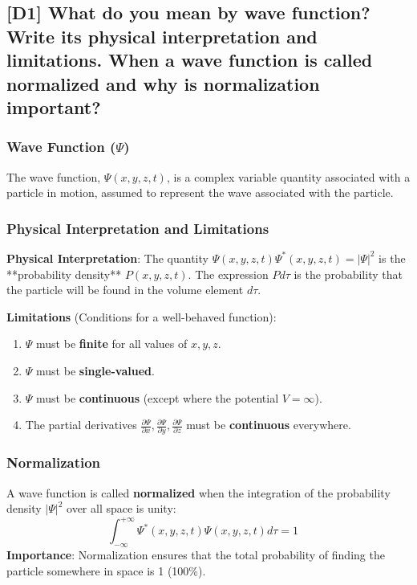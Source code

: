 \documentclass[12pt]{article}
\begin{document}
\subsection{[D1] What do you mean by wave function? Write its physical interpretation and limitations. When a wave function is called normalized and why is normalization important?}

\subsubsection*{Wave Function ($\Psi$)}
The wave function, $\Psi(x, y, z, t)$, is a complex variable quantity associated with a particle in motion, assumed to represent the wave associated with the particle.

\subsubsection*{Physical Interpretation and Limitations}
\textbf{Physical Interpretation}: The quantity $\Psi(x, y, z, t) \Psi^*(x, y, z, t) = |\Psi|^2$ is the **probability density** $P(x, y, z, t)$. The expression $P d\tau$ is the probability that the particle will be found in the volume element $d\tau$.

\textbf{Limitations} (Conditions for a well-behaved function):
\begin{enumerate}
    \item $\Psi$ must be \textbf{finite} for all values of $x, y, z$.
    \item $\Psi$ must be \textbf{single-valued}.
    \item $\Psi$ must be \textbf{continuous} (except where the potential $V = \infty$).
    \item The partial derivatives $\frac{\partial\Psi}{\partial x}, \frac{\partial\Psi}{\partial y}, \frac{\partial\Psi}{\partial z}$ must be \textbf{continuous} everywhere.
\end{enumerate}

\subsubsection*{Normalization}
A wave function is called \textbf{normalized} when the integration of the probability density $|\Psi|^2$ over all space is unity:
$$
\int_{-\infty}^{+\infty} \Psi^*(x, y, z, t) \Psi(x, y, z, t) d\tau = 1 \quad \text{}
$$
\textbf{Importance}: Normalization ensures that the total probability of finding the particle somewhere in space is 1 (100\%).
\end{document}
